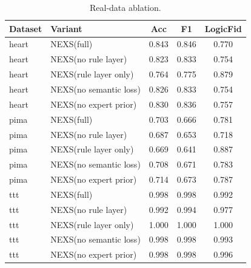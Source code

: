 \begin{table}[t]\centering
\caption{Real-data ablation.}
\label{tab:realabl}
\begin{tabular}{llccc}
\toprule
Dataset & Variant & Acc & F1 & LogicFid \\
\midrule
heart & NEXS(full) & 0.843 & 0.846 & 0.770 \\
heart & NEXS(no rule layer) & 0.823 & 0.833 & 0.754 \\
heart & NEXS(rule layer only) & 0.764 & 0.775 & 0.879 \\
heart & NEXS(no semantic loss) & 0.826 & 0.833 & 0.754 \\
heart & NEXS(no expert prior) & 0.830 & 0.836 & 0.757 \\
\midrule
pima & NEXS(full) & 0.703 & 0.666 & 0.781 \\
pima & NEXS(no rule layer) & 0.687 & 0.653 & 0.718 \\
pima & NEXS(rule layer only) & 0.669 & 0.641 & 0.887 \\
pima & NEXS(no semantic loss) & 0.708 & 0.671 & 0.783 \\
pima & NEXS(no expert prior) & 0.714 & 0.673 & 0.787 \\
\midrule
ttt & NEXS(full) & 0.998 & 0.998 & 0.992 \\
ttt & NEXS(no rule layer) & 0.992 & 0.994 & 0.977 \\
ttt & NEXS(rule layer only) & 1.000 & 1.000 & 1.000 \\
ttt & NEXS(no semantic loss) & 0.998 & 0.998 & 0.993 \\
ttt & NEXS(no expert prior) & 0.998 & 0.998 & 0.996 \\
\bottomrule
\end{tabular}
\end{table}